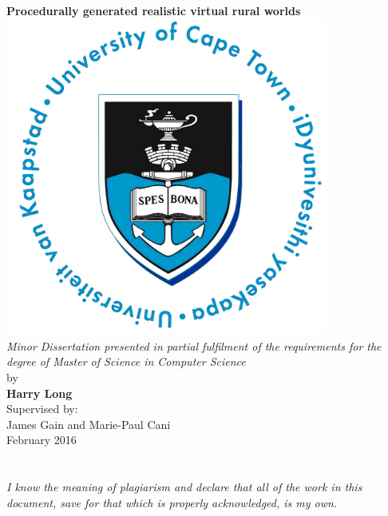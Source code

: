\documentclass[a4paper,11pt]{report}
\begin{document}
\begin{titlepage}
\begin{center}
\Huge
\textbf{Procedurally generated realistic virtual rural worlds}
\includegraphics[width = 400px]{uct_logo.jpg} \\
\large
\vfill
\emph{Minor Dissertation presented in partial fulfilment of the requirements for the degree of Master of Science in Computer Science} \\
\normalsize
\vfill
by \\
\Large
\vfill
\textbf{Harry Long} \\
\normalsize
\vfill
Supervised by: \\
\large
\vfill
James Gain and Marie-Paul Cani \\
\normalsize
\vfill
February 2016
\end{center}
\end{titlepage}

\chapter*{}
\begin{center}
\begin{minipage}{.6\textwidth}
\Large
\emph{I know the meaning of plagiarism and declare that all of the work in this document, save for that which is properly acknowledged, is my own.}
\normalsize
\end{minipage}
\end{center}
\end{document}
